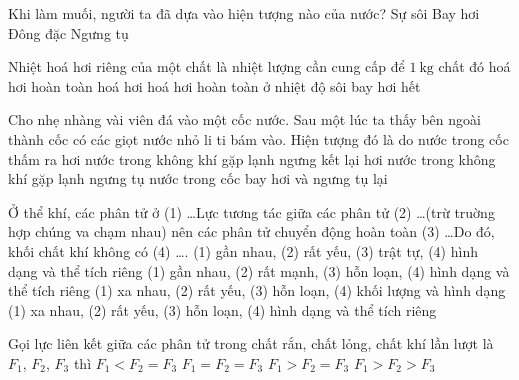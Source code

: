 \begin{ex}
	Khi làm muối, người ta đã dựa vào hiện tượng nào của nước?
	\choice
	{Sự sôi}
	{\True Bay hơi}
	{Đông đặc}
	{Ngưng tụ}
	\loigiai{}
\end{ex}
\begin{ex}
	Nhiệt hoá hơi riêng của một chất là nhiệt lượng cần cung cấp để $\SI{1}{\kilogram}$ chất đó
	\choice
	{hoá hơi hoàn toàn}
	{hoá hơi}
	{\True hoá hơi hoàn toàn ở nhiệt độ sôi}
	{bay hơi hết}
	\loigiai{}
\end{ex}
\begin{ex}
	Cho nhẹ nhàng vài viên đá vào một cốc nước. Sau một lúc ta thấy bên ngoài thành cốc có các giọt nước nhỏ li ti bám vào. Hiện tượng đó là do
	\choice
	{nước trong cốc thấm ra}
	{hơi nước trong không khí gặp lạnh ngưng kết lại}
	{\True hơi nước trong không khí gặp lạnh ngưng tụ}
	{nước trong cốc bay hơi và ngưng tụ lại}
	\loigiai{}
\end{ex}
\begin{ex}
	Ở thể khí, các phân tử ở (1) \dots Lực tương tác giữa các phân tử (2) \dots (trừ truờng hợp chúng va chạm nhau) nên các phân tử chuyển động hoàn toàn (3) \dots Do đó, khối chất khí không có (4) \dots.
	\choice
	{(1) gần nhau, (2) rất yếu, (3) trật tự, (4) hình dạng và thể tích riêng}
	{(1) gần nhau, (2) rất mạnh, (3) hỗn loạn, (4) hình dạng và thể tích riêng}
	{(1) xa nhau, (2) rất yếu, (3) hỗn loạn, (4) khối lượng và hình dạng}
	{\True (1) xa nhau, (2) rất yếu, (3) hỗn loạn, (4) hình dạng và thể tích riêng}
	\loigiai{}
\end{ex}
\begin{ex}
	Gọi lực liên kết giữa các phân tử trong chất rắn, chất lỏng, chất khí lần lượt là $F_{1}$, $F_{2}$, $F_{3}$ thì
	\choice
	{$F_{1}<F_{2}=F_{3}$}
	{$F_{1}=F_{2}=F_{3}$}
	{$F_{1}>F_{2}=F_{3}$}
	{\True $F_{1}>F_{2}>F_{3}$}
	\loigiai{}
\end{ex}

